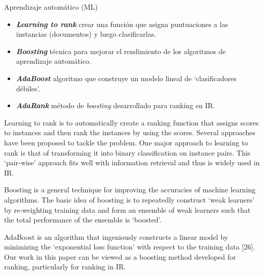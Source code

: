 \documentclass{beamer}
\begin{document}
\begin{frame}{Aprendizaje automático (ML)}
    \begin{itemize}
        \item \textbf{\textit{Learning to rank}} crear una función que asigna puntuaciones a las instancias (documentos) y luego clasificarlas.
        \item \textbf{\textit{Boosting}} técnica para mejorar el rendimiento de los algoritmos de aprendizaje automático.
        \item \textbf{\textit{AdaBoost}} algoritmo que construye un modelo lineal de ‘clasificadores débiles’.
        \item \textbf{\textit{AdaRank}} método de \textit{boosting} desarrollado para ranking en IR.
    \end{itemize}

    \begin{note}
        {Learning to rank is to automatically create a ranking function that assigns scores to instances and then rank the instances by using the scores. Several approaches have been proposed to tackle the problem. One major approach to learning to rank is that of transforming it into binary classification on instance pairs. This ‘pair-wise’ approach fits well with information retrieval and thus is widely used in IR.

        Boosting is a general technique for improving the accuracies of machine learning algorithms. The basic idea of boosting is to repeatedly construct ‘weak learners’ by re-weighting training data and form an ensemble of weak learners such that the total performance of the ensemble is ‘boosted’.

        AdaBoost is an algorithm that ingeniously constructs a linear model by minimizing the ‘exponential loss function’ with respect to the training data [26]. Our work in this paper can be viewed as a boosting method developed for ranking, particularly for ranking in IR.}
    \end{note}
\end{frame}
\end{document}
